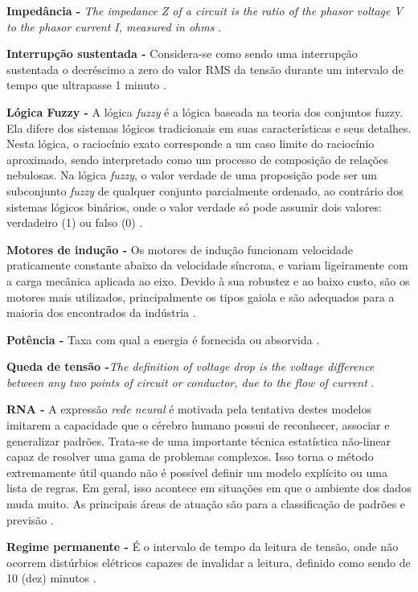 \noindent
\textbf{Impedância -} \textit{The impedance Z of a circuit is the ratio of the phasor voltage V to the phasor current I, measured in ohms} \cite{SAD03}.

\noindent
\textbf{Interrupção sustentada -} Considera-se como sendo uma interrupção sustentada o decréscimo a zero do valor RMS da tensão durante um intervalo de tempo que ultrapasse 1 minuto \cite{JUN09}.

\noindent
\textbf{Lógica Fuzzy -} A lógica \textit{fuzzy} é a lógica baseada na teoria dos conjuntos fuzzy. Ela difere dos sistemas lógicos tradicionais em suas características e seus detalhes. Nesta lógica, o raciocínio exato corresponde a um caso limite do raciocínio aproximado, sendo  interpretado como um processo de composição de relações  nebulosas.  Na lógica \textit{fuzzy}, o valor verdade de uma proposição pode ser um subconjunto \textit{fuzzy} de qualquer conjunto parcialmente ordenado, ao contrário dos sistemas lógicos binários, onde o valor verdade só pode assumir dois valores: verdadeiro (1) ou falso (0) \cite{GOM94}. 

\noindent
\textbf{Motores de indução -} Os motores de indução funcionam velocidade praticamente constante abaixo da velocidade síncrona, e variam ligeiramente com a carga mecânica aplicada ao eixo. Devido à sua robustez e ao baixo custo, são os motores mais utilizados, principalmente os tipos gaiola e são adequados para a maioria dos encontrados da indústria \cite{COR05}. 

\noindent
\textbf{Potência -} Taxa com qual a energia é fornecida ou absorvida \cite{DOR08}.

\noindent
\textbf{Queda de tensão -}\textit{The definition of voltage drop is the voltage difference between any two points of circuit or conductor, due to the flow of current} \cite{LOC08}.

\noindent
\textbf{RNA -} A expressão \textit{rede neural} é motivada pela tentativa destes modelos imitarem a capacidade que o cérebro humano possui de reconhecer, associar e generalizar padrões. Trata-se de uma importante técnica estatística não-linear capaz de resolver uma gama de problemas complexos. Isso torna o método extremamente útil quando não é possível definir um modelo explícito ou uma lista de regras. Em geral, isso acontece em situações em que o ambiente dos dados muda muito. As principais áreas de atuação são para a classificação de padrões e previsão \cite{VEL07}.

\noindent
\textbf{Regime permanente -} É o intervalo de tempo da leitura de tensão, onde não ocorrem distúrbios elétricos capazes de invalidar a leitura, definido como sendo de 10 (dez) minutos \cite{ANE01}.

